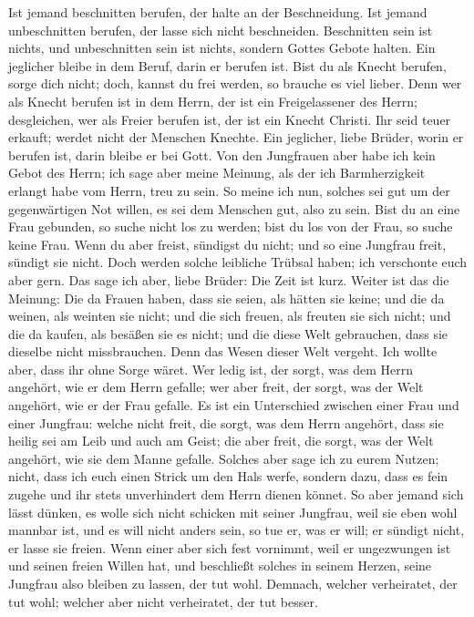  Ist jemand beschnitten berufen, der halte an der
Beschneidung. Ist jemand unbeschnitten berufen, der lasse sich nicht
beschneiden.  Beschnitten sein ist nichts, und
unbeschnitten sein ist nichts, sondern Gottes Gebote halten.
 Ein jeglicher bleibe in dem Beruf, darin er berufen ist.
 Bist du als Knecht berufen, sorge dich nicht; doch,
kannst du frei werden, so brauche es viel lieber.  Denn
wer als Knecht berufen ist in dem Herrn, der ist ein Freigelassener des
Herrn; desgleichen, wer als Freier berufen ist, der ist ein Knecht
Christi.  Ihr seid teuer erkauft; werdet nicht der
Menschen Knechte.  Ein jeglicher, liebe Brüder, worin er
berufen ist, darin bleibe er bei Gott.  Von den
Jungfrauen aber habe ich kein Gebot des Herrn; ich sage aber meine
Meinung, als der ich Barmherzigkeit erlangt habe vom Herrn, treu zu
sein.  So meine ich nun, solches sei gut um der
gegenwärtigen Not willen, es sei dem Menschen gut, also zu sein.
 Bist du an eine Frau gebunden, so suche nicht los zu
werden; bist du los von der Frau, so suche keine Frau. 
Wenn du aber freist, sündigst du nicht; und so eine Jungfrau freit,
sündigt sie nicht. Doch werden solche leibliche Trübsal haben; ich
verschonte euch aber gern.  Das sage ich aber, liebe
Brüder: Die Zeit ist kurz. Weiter ist das die Meinung: Die da Frauen
haben, dass sie seien, als hätten sie keine; und die da weinen, als
weinten sie nicht;  und die sich freuen, als freuten sie
sich nicht; und die da kaufen, als besäßen sie es nicht; 
und die diese Welt gebrauchen, dass sie dieselbe nicht missbrauchen.
Denn das Wesen dieser Welt vergeht.  Ich wollte aber,
dass ihr ohne Sorge wäret. Wer ledig ist, der sorgt, was dem Herrn
angehört, wie er dem Herrn gefalle;  wer aber freit, der
sorgt, was der Welt angehört, wie er der Frau gefalle. Es ist ein
Unterschied zwischen einer Frau und einer Jungfrau: 
welche nicht freit, die sorgt, was dem Herrn angehört, dass sie heilig
sei am Leib und auch am Geist; die aber freit, die sorgt, was der Welt
angehört, wie sie dem Manne gefalle.  Solches aber sage
ich zu eurem Nutzen; nicht, dass ich euch einen Strick um den Hals
werfe, sondern dazu, dass es fein zugehe und ihr stets unverhindert dem
Herrn dienen könnet.  So aber jemand sich lässt dünken,
es wolle sich nicht schicken mit seiner Jungfrau, weil sie eben wohl
mannbar ist, und es will nicht anders sein, so tue er, was er will; er
sündigt nicht, er lasse sie freien.  Wenn einer aber sich
fest vornimmt, weil er ungezwungen ist und seinen freien Willen hat, und
beschließt solches in seinem Herzen, seine Jungfrau also bleiben zu
lassen, der tut wohl.  Demnach, welcher verheiratet, der
tut wohl; welcher aber nicht verheiratet, der tut besser.

